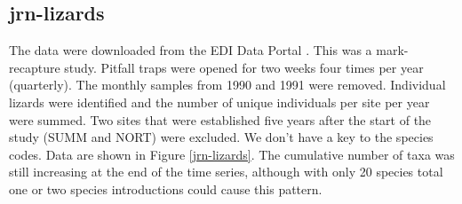 \documentclass[11pt, oneside]{article}
\begin{document}
\subsection {jrn-lizards}
The data were downloaded from the EDI Data Portal \citep{jrn-lizard}.
This was a mark-recapture study. 
Pitfall traps were opened for two weeks four times per year (quarterly). 
The monthly samples from 1990 and 1991 were removed.
Individual lizards were identified and the number of unique individuals per site per year were summed. 
Two sites that were established five years after the start of the study (SUMM and NORT) were excluded. 
We don't have a key to the species codes.
Data are shown in Figure \ref{jrn-lizards}.
The cumulative number of taxa was still increasing at the end of the time series, although with only 20 species total one or two species introductions could cause this pattern.
\end{document}
